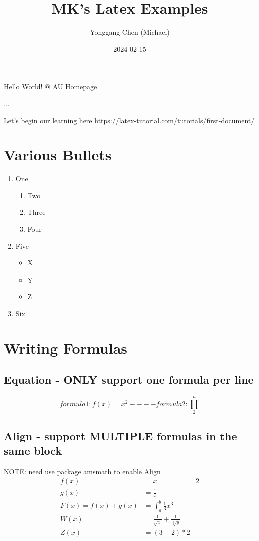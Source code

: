 \documentclass{article}
\title{MK's Latex Examples}
\date{2024-02-15}
\author{Yonggang Chen (Michael)}
\begin{document}
  \maketitle
  \newpage


  \tableofcontents
  \newpage


  {\Huge Hello World! @ \href{https://www.auburn.edu/}{AU Homepage} }

  {\huge ... }

  {\huge Let's begin our learning here }
  {\large \url{https://latex-tutorial.com/tutorials/first-document/} }
  \newpage

  \section{Various Bullets}
  \begin{enumerate}
    \item One
    \begin{enumerate}
        \item Two
        \item Three
        \item Four
    \end{enumerate}
    \item Five
      \begin{itemize}
        \item X
        \item Y
        \item Z
      \end{itemize}
    \item Six
  \end{enumerate}
  \newpage


  \section{Writing Formulas}
  \subsection{Equation - ONLY support one formula per line}
  \begin{equation}
    formula 1: f(x) = x^2   ----
    formula 2: \prod_{2}^{n}
  \end{equation}

  \subsection{Align - support MULTIPLE formulas in the same block}
  NOTE: need use package amsmath to enable Align 
  \begin{align*}
    f(x) &= x & 2 \\
    g(x) &= \frac{1}{x} \\
    F(x) = f(x) + g(x) &= \int_{a}^{b} \frac{1}{3}x^3 \\
    W(x) &= \frac{1}{\sqrt{x}} + \frac{1}{\sqrt[3]{y}} \\
    Z(x) &= \left( 3 + 2 \right) * 2
  \end{align*}
\end{document}
